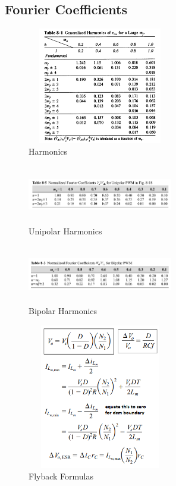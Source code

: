 \documentclass[twocolumn, ]{article}
\begin{document}
\subsection*{Fourier Coefficients}
\begin{figure}[!ht]
	\includegraphics[width=2.5in,height=2in]{pwm_harmonics_table.png}
	\caption{Harmonics}
\end{figure}
\begin{figure}[!ht]
	\includegraphics[width=2.5in,height=1in]{unipolar_harmonics2.png}
	\caption{Unipolar Harmonics}
\end{figure}
\begin{figure}[!ht]
	\includegraphics[width=2.5in,height=1in]{bipolar_harmonics2.png}
	\caption{Bipolar Harmonics}
\end{figure}
\begin{figure}[!ht]
	\includegraphics[width=2.5in,height=2.5in]{flybackformulasfromhart.png}
	\caption{Flyback Formulas}
\end{figure}
\end{document}

